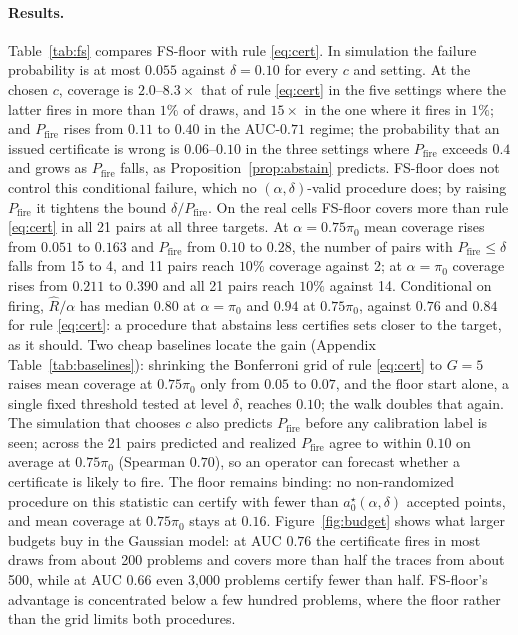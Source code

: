 \documentclass[twoside]{article}
\theoremstyle{remark}
\newcommand{\pizero}{\pi_0}
\newcommand{\pfire}{P_{\mathrm{fire}}}
\begin{document}
\paragraph{Results.} Table~\ref{tab:fs} compares FS-floor with rule \eqref{eq:cert}. In simulation the failure probability is at most $0.055$ against $\delta=0.10$ for every $c$ and setting. At the chosen $c$, coverage is $2.0$--$8.3\times$ that of rule \eqref{eq:cert} in the five settings where the latter fires in more than $1\%$ of draws, and $15\times$ in the one where it fires in $1\%$; and $\pfire$ rises from $0.11$ to $0.40$ in the AUC-$0.71$ regime; the probability that an issued certificate is wrong is $0.06$--$0.10$ in the three settings where $\pfire$ exceeds $0.4$ and grows as $\pfire$ falls, as Proposition~\ref{prop:abstain} predicts. FS-floor does not control this conditional failure, which no $(\alpha,\delta)$-valid procedure does; by raising $\pfire$ it tightens the bound $\delta/\pfire$. On the real cells FS-floor covers more than rule \eqref{eq:cert} in all 21 pairs at all three targets. At $\alpha=0.75\pizero$ mean coverage rises from $0.051$ to $0.163$ and $\pfire$ from $0.10$ to $0.28$, the number of pairs with $\pfire\le\delta$ falls from 15 to 4, and 11 pairs reach $10\%$ coverage against 2; at $\alpha=\pizero$ coverage rises from $0.211$ to $0.390$ and all 21 pairs reach $10\%$ against 14. Conditional on firing, $\hat R/\alpha$ has median $0.80$ at $\alpha=\pizero$ and $0.94$ at $0.75\pizero$, against $0.76$ and $0.84$ for rule \eqref{eq:cert}: a procedure that abstains less certifies sets closer to the target, as it should. Two cheap baselines locate the gain (Appendix Table~\ref{tab:baselines}): shrinking the Bonferroni grid of rule \eqref{eq:cert} to $G=5$ raises mean coverage at $0.75\pizero$ only from $0.05$ to $0.07$, and the floor start alone, a single fixed threshold tested at level $\delta$, reaches $0.10$; the walk doubles that again. The simulation that chooses $c$ also predicts $\pfire$ before any calibration label is seen; across the 21 pairs predicted and realized $\pfire$ agree to within $0.10$ on average at $0.75\pizero$ (Spearman $0.70$), so an operator can forecast whether a certificate is likely to fire. The floor remains binding: no non-randomized procedure on this statistic can certify with fewer than $a_0^\star(\alpha,\delta)$ accepted points, and mean coverage at $0.75\pizero$ stays at $0.16$. Figure~\ref{fig:budget} shows what larger budgets buy in the Gaussian model: at AUC $0.76$ the certificate fires in most draws from about 200 problems and covers more than half the traces from about 500, while at AUC $0.66$ even 3{,}000 problems certify fewer than half. FS-floor's advantage is concentrated below a few hundred problems, where the floor rather than the grid limits both procedures.
\end{document}
